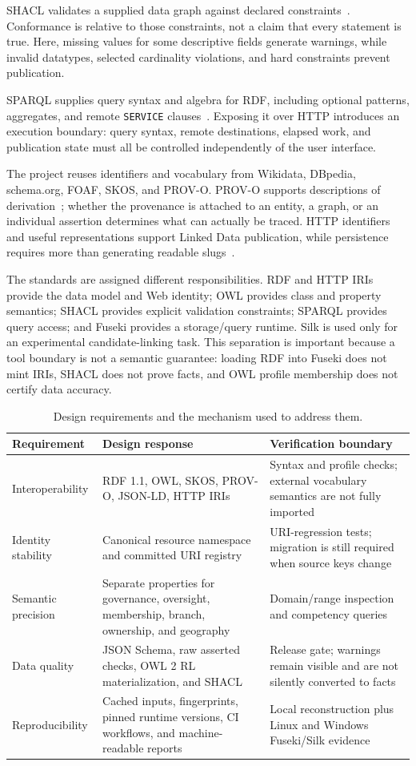 \documentclass[11pt,a4paper]{article}
\newcommand{\term}[1]{\texttt{#1}}
\begin{document}
SHACL validates a supplied data graph against declared constraints~\cite{shacl}.
Conformance is relative to those constraints, not a claim that every statement is true.
Here, missing values for some descriptive fields generate warnings, while invalid
datatypes, selected cardinality violations, and hard constraints prevent publication.

SPARQL supplies query syntax and algebra for RDF, including optional patterns, aggregates,
and remote \term{SERVICE} clauses~\cite{sparql}. Exposing it over HTTP introduces an
execution boundary: query syntax, remote destinations, elapsed work, and publication state
must all be controlled independently of the user interface.

The project reuses identifiers and vocabulary from Wikidata, DBpedia, schema.org, FOAF,
SKOS, and PROV-O. PROV-O supports descriptions of derivation~\cite{prov}; whether the
provenance is attached to an entity, a graph, or an individual assertion determines what
can actually be traced. HTTP identifiers and useful representations support Linked Data
publication, while persistence requires more than generating readable slugs~\cite{uris}.

The standards are assigned different responsibilities. RDF and HTTP IRIs provide the data
model and Web identity; OWL provides class and property semantics; SHACL provides explicit
validation constraints; SPARQL provides query access; and Fuseki provides a storage/query
runtime. Silk is used only for an experimental candidate-linking task. This separation is
important because a tool boundary is not a semantic guarantee: loading RDF into Fuseki does
not mint IRIs, SHACL does not prove facts, and OWL profile membership does not certify data
accuracy.

\begin{table}[htbp]\centering\small
\caption{Design requirements and the mechanism used to address them.}\label{tab:requirements}
\begin{tabularx}{\textwidth}{p{3.2cm}XX}\toprule
Requirement & Design response & Verification boundary \\\midrule
Interoperability & RDF 1.1, OWL, SKOS, PROV-O, JSON-LD, HTTP IRIs & Syntax and profile checks; external vocabulary semantics are not fully imported \\
Identity stability & Canonical resource namespace and committed URI registry & URI-regression tests; migration is still required when source keys change \\
Semantic precision & Separate properties for governance, oversight, membership, branch, ownership, and geography & Domain/range inspection and competency queries \\
Data quality & JSON Schema, raw asserted checks, OWL 2 RL materialization, and SHACL & Release gate; warnings remain visible and are not silently converted to facts \\
Reproducibility & Cached inputs, fingerprints, pinned runtime versions, CI workflows, and machine-readable reports & Local reconstruction plus Linux and Windows Fuseki/Silk evidence \\
\bottomrule
\end{tabularx}
\end{table}
\end{document}
